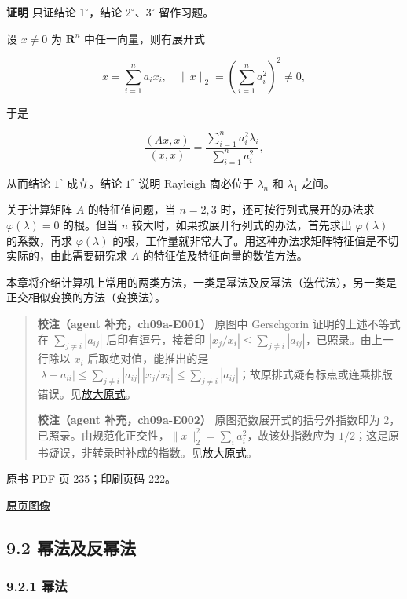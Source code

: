 \textbf{证明} 只证结论 \(1^\circ\)，结论 \(2^\circ\)、\(3^\circ\) 留作习题。

设 \(x\ne0\) 为 \(\mathbf R^n\) 中任一向量，则有展开式

\[
x=\sum_{i=1}^na_ix_i,\quad \|x\|_2=\left(\sum_{i=1}^na_i^2\right)^2\ne0,
\]

于是

\[
\frac{(Ax,x)}{(x,x)}=\frac{\displaystyle\sum_{i=1}^na_i^2\lambda_i}{\displaystyle\sum_{i=1}^na_i^2},
\]

从而结论 \(1^\circ\) 成立。结论 \(1^\circ\) 说明 Rayleigh 商必位于 \(\lambda_n\) 和 \(\lambda_1\) 之间。

关于计算矩阵 \(A\) 的特征值问题，当 \(n=2,3\) 时，还可按行列式展开的办法求 \(\varphi(\lambda)=0\) 的根。但当 \(n\) 较大时，如果按展开行列式的办法，首先求出 \(\varphi(\lambda)\) 的系数，再求 \(\varphi(\lambda)\) 的根，工作量就非常大了。用这种办法求矩阵特征值是不切实际的，由此需要研究求 \(A\) 的特征值及特征向量的数值方法。

本章将介绍计算机上常用的两类方法，一类是幂法及反幂法（迭代法），另一类是正交相似变换的方法（变换法）。

\begin{quote}
\textbf{校注（agent 补充，ch09a-E001）} 原图中 Gerschgorin 证明的上述不等式在 \(\sum_{j\ne i}|a_{ij}|\) 后印有逗号，接着印 \(|x_j/x_i|\leq\sum_{j\ne i}|a_{ij}|\)，已照录。由上一行除以 \(x_i\) 后取绝对值，能推出的是 \(|\lambda-a_{ii}|\leq\sum_{j\ne i}|a_{ij}|\,|x_j/x_i|\leq\sum_{j\ne i}|a_{ij}|\)；故原排式疑有标点或连乘排版错误。见\href{verified/assets/ch09a/review-p234-gershgorin.png}{放大原式}。

\textbf{校注（agent 补充，ch09a-E002）} 原图范数展开式的括号外指数印为 \(2\)，已照录。由规范化正交性，\(\|x\|_2^2=\sum_i a_i^2\)，故该处指数应为 \(1/2\)；这是原书疑误，非转录时补成的指数。见\href{verified/assets/ch09a/review-p234-norm.png}{放大原式}。
\end{quote}

\clearpage

原书 PDF 页 235；印刷页码 222。

\href{source-images/pdf-235.jpeg}{原页图像}

\subsection{9.2 幂法及反幂法}\label{ch09a-ux5e42ux6cd5ux53caux53cdux5e42ux6cd5}

\subsubsection{9.2.1 幂法}\label{ch09a-ux5e42ux6cd5}

